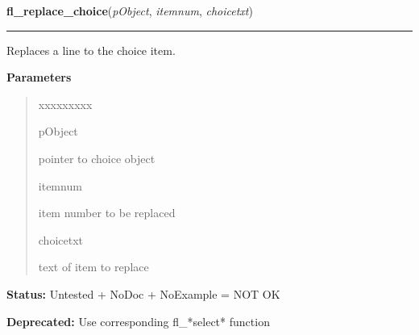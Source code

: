 \hspace{.8\funcindent}\begin{boxedminipage}{\funcwidth}

    \raggedright \textbf{fl\_replace\_choice}(\textit{pObject}, \textit{itemnum}, \textit{choicetxt})

    \vspace{-1.5ex}

    \rule{\textwidth}{0.5\fboxrule}
\setlength{\parskip}{2ex}
    Replaces a line to the choice item.

\setlength{\parskip}{1ex}
      \textbf{Parameters}
      \vspace{-1ex}

      \begin{quote}
        \begin{Ventry}{xxxxxxxxx}

          \item[pObject]

          pointer to choice object

          \item[itemnum]

          item number to be replaced

          \item[choicetxt]

          text of item to replace

        \end{Ventry}

      \end{quote}

\textbf{Status:} Untested + NoDoc + NoExample = NOT OK



\textbf{Deprecated:} Use corresponding fl\_*select* function



    \end{boxedminipage}

    \label{xformslib:library:fl_delete_choice}

    \vspace{0.5ex}

